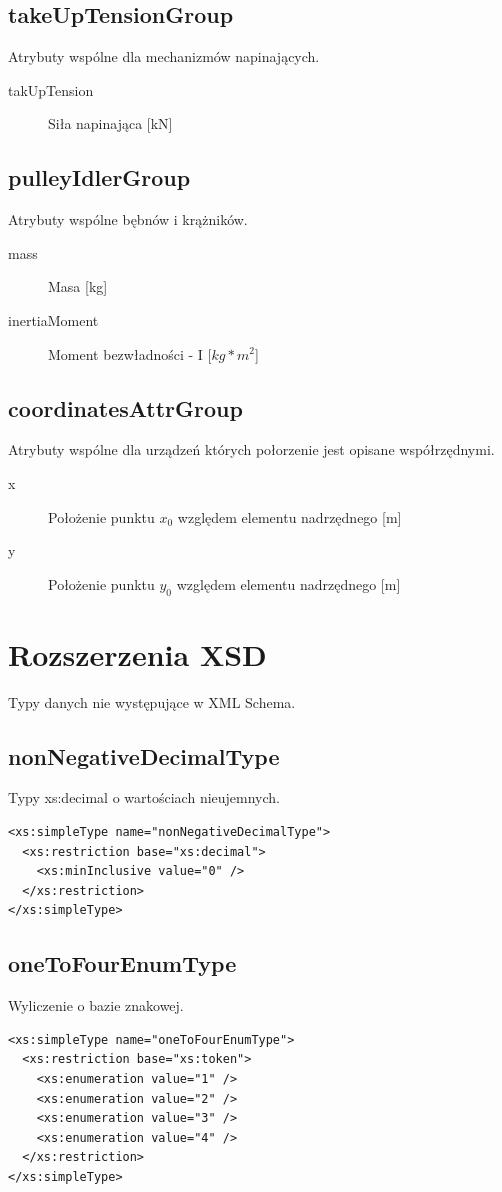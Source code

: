 \documentclass[12pt,a4paper]{article}
\begin{document}
\subsection{takeUpTensionGroup}
Atrybuty wspólne dla mechanizmów napinających.

\begin{description}
\item[takUpTension] Siła napinająca [kN]
\end{description}

\subsection{pulleyIdlerGroup}
Atrybuty wspólne bębnów i krążników.

\begin{description}
\item[mass] Masa [kg]
\item[inertiaMoment] Moment bezwładności - I [$kg*m^2$]
\end{description}

\subsection{coordinatesAttrGroup}
Atrybuty wspólne dla urządzeń których połorzenie jest opisane współrzędnymi.

\begin{description}
\item[x] Położenie punktu $x_0$ względem elementu nadrzędnego [m]
\item[y] Położenie punktu $y_0$ względem elementu nadrzędnego [m]
\end{description}

\section{Rozszerzenia XSD}
Typy danych nie występujące w XML Schema.

\subsection{nonNegativeDecimalType}
Typy xs:decimal o wartościach nieujemnych.

\begin{verbatim}
<xs:simpleType name="nonNegativeDecimalType">
  <xs:restriction base="xs:decimal">
    <xs:minInclusive value="0" />
  </xs:restriction>
</xs:simpleType>
\end{verbatim}

\subsection{oneToFourEnumType}
Wyliczenie o bazie znakowej.

\begin{verbatim}
<xs:simpleType name="oneToFourEnumType">
  <xs:restriction base="xs:token">
    <xs:enumeration value="1" />
    <xs:enumeration value="2" />
    <xs:enumeration value="3" />
    <xs:enumeration value="4" />
  </xs:restriction>
</xs:simpleType>
\end{verbatim}
\end{document}
